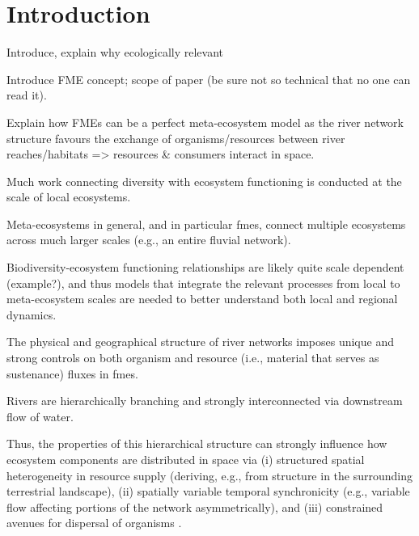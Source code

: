 \section{Introduction}

\begin{itemize}
    {Introduce, explain why ecologically relevant}
    
		{Introduce FME concept; scope of paper (be sure not so technical that no one can read it). 
		
		Explain how FMEs can be a perfect meta-ecosystem model as the river network structure favours the exchange of organisms/resources between river reaches/habitats => resources \& consumers interact in space.
		
		Much work connecting diversity with ecosystem functioning is conducted at the scale of local ecosystems.
		
		Meta-ecosystems in general, and in particular \acp{fme}, connect multiple ecosystems across much larger scales (e.g., an entire fluvial network).
		
		Biodiversity-ecosystem functioning relationships are likely quite scale dependent \autocite{Gonzalez2020} (example?), and thus models that integrate the relevant processes from local to meta-ecosystem scales are needed to better understand both local and regional dynamics.}
		
		{The physical and geographical structure of river networks imposes unique and strong controls on both organism and resource (i.e., material that serves as sustenance)  fluxes in \acp{fme}.
		
		Rivers are hierarchically branching and strongly interconnected via downstream flow of water.
		
		Thus, the properties of this hierarchical structure can strongly influence how ecosystem components are distributed in space via (i) structured spatial heterogeneity in resource supply (deriving, e.g., from structure in the surrounding terrestrial landscape), (ii) spatially variable temporal synchronicity (e.g., variable flow affecting portions of the network asymmetrically), and (iii) constrained avenues for dispersal of organisms \autocite{Helton2018,BENDA2004,Heino2015}.
		
}
\end{itemize}
